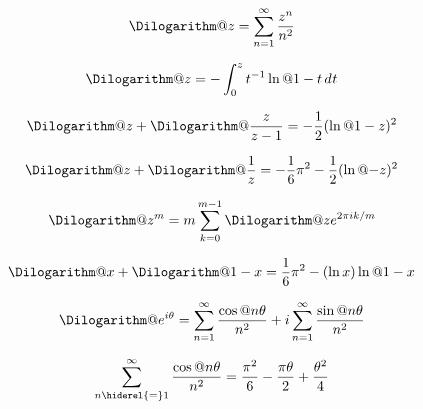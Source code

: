\documentclass{article}
\begin{document}
\begin{equation}\label{eq:ZE.JON.DI1}%
  \Dilogarithm@{z} = \sum_{n=1}^\infty \frac{z^n}{n^2}
\end{equation}

\begin{equation}\label{eq:ZE.JON.DI2}%
  \Dilogarithm@{z} = -\int_0^z t^{-1} \ln@{1-t} \diff{t}
\end{equation}


\begin{equation}\label{eq:ZE.JON.DI3}%
  \Dilogarithm@{z} + \Dilogarithm@{\frac{z}{z-1}}
  = - \frac{1}{2} (\ln@{1-z})^2
\end{equation}

\begin{equation}\label{eq:ZE.JON.DI4}%
  \Dilogarithm@{z} + \Dilogarithm@{\frac{1}{z}}
  = - \frac{1}{6} \cpi^2 -\frac{1}{2} (\ln@{-z})^2
\end{equation}

\begin{equation}\label{eq:ZE.JON.DI5}%
  \Dilogarithm@{z^m}
  = m \sum_{k=0}^{m-1} \Dilogarithm@{z \expe^{2 \cpi \iunit k/m}}
\end{equation}

\begin{equation}\label{eq:ZE.JON.DI5A}%
  \Dilogarithm@{x} + \Dilogarithm@{1-x} = \frac{1}{6} \cpi^2 -
   (\ln x) \ln@{1-x}
\end{equation}

\begin{equation}\label{eq:ZE.JON.DI6}%
  \Dilogarithm@{\expe^{\iunit\theta}}
  = \sum_{n=1}^\infty \frac{\cos@{n \theta}}{n^2}
  + \iunit \sum_{n=1}^\infty \frac{\sin@{n \theta}}{n^2}
\end{equation}

\begin{equation}\label{eq:ZE.JON.DI7}%
  \sum_{n \hiderel{=} 1}^\infty \frac{\cos@{n \theta}}{n^2}
  = \frac{\cpi^2}{6} - \frac{\cpi \theta}{2} + \frac{\theta^2}{4}
\end{equation}
\end{document}
